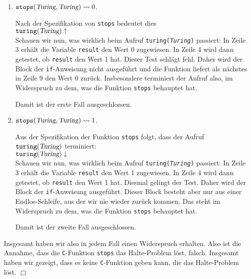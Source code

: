 \begin{enumerate}
\item $\mathtt{stops}(\textsl{Turing}, \textsl{Turing}) \leadsto 0$. 

      Nach der Spezifikation von \texttt{stops} bedeutet dies \\[0.1cm]
      \hspace*{1.3cm} $\mathtt{turing}(\textsl{Turing}) \uparrow$ \\[0.1cm]
      Schauen wir nun, was wirklich beim Aufruf \texttt{turing(\textsl{Turing})} passiert:
      In Zeile 3 erh\"alt die Variable \texttt{result} den Wert 0 zugewiesen.  In Zeile 4
      wird dann getestet, ob \texttt{result} den Wert 1 hat.  Dieser Test schl\"agt fehl.
      Daher wird der Block der \texttt{if}-Anweisung nicht ausgef\"uhrt und die Funktion liefert als
      n\"achstes in Zeile 9 den Wert 0 zur\"uck.  Insbesondere terminiert der Aufruf also, im
      Widerspruch zu dem, was die Funktion \texttt{stops} behauptet hat.

      Damit ist der erste Fall ausgeschlossen.
\item  $\mathtt{stops}(\textsl{Turing}, \textsl{Turing}) \leadsto 1$. 

      Aus der Spezifikation der Funktion \texttt{stops} folgt, dass der Aufruf
      $\mathtt{turing}(\textsl{Turing})$ terminiert: \\[0.1cm]
      \hspace*{1.3cm} $\mathtt{turing}(\textsl{Turing}) \downarrow$ \\[0.1cm]
      Schauen wir nun, was wirklich beim Aufruf \texttt{turing(\textsl{Turing})} passiert:
      In Zeile 3 erh\"alt die Variable \texttt{result} den Wert 1 zugewiesen.  In Zeile 4
      wird dann getestet, ob \texttt{result} den Wert 1 hat.  Diesmal gelingt der Test.
      Daher wird der Block der \texttt{if}-Anweisung ausgef\"uhrt.  Dieser Block
      besteht aber nur aus einer Endlos-Schleife, aus der wir nie wieder zur\"uck kommen.
      Das steht im Widerspruch zu dem, was die Funktion \texttt{stops} behauptet hat.

      Damit ist der zweite Fall ausgeschlossen.
\end{enumerate}
Insgesamt haben wir also in jedem Fall einen Widerspruch erhalten.  
Also ist die Annahme, dass die \texttt{C}-Funktion \texttt{stops}
das Halte-Problem l\"ost, falsch.  Insgesamt haben wir gezeigt, dass es keine \texttt{C}-Funktion
geben kann, die das Halte-Problem l\"ost. \hspace*{\fill} $\Box$

